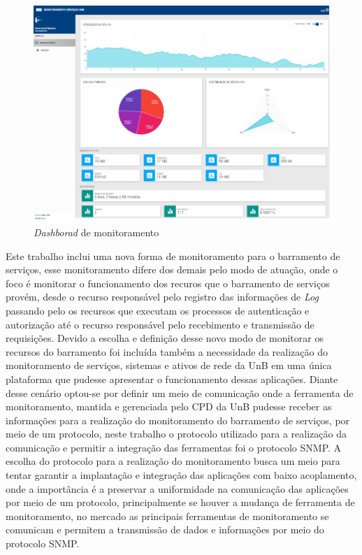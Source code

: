 \begin{figure}[h!]
	\begin{center}
	\includegraphics[scale = 0.70]{img/dashboard.jpg}
		\caption{\textit{Dashborad} de monitoramento \cite{filgueirasmonitoramento}}
		\label{fun:fig:dashboardS}
	\end{center}
\end{figure}

Este trabalho inclui uma nova forma de monitoramento para o barramento de serviços, esse monitoramento difere dos demais pelo modo de atuação, onde o foco é monitorar o funcionamento dos recuros que o barramento de serviços provém, desde o recurso responsável pelo registro das informações de \textit{Log} passando pelo os recursos que executam os processos de autenticação e autorização até o recurso responsável pelo recebimento e transmissão de requisições. Devido a escolha e definição desse novo modo de monitorar os recursos do barramento foi incluída também a necessidade da realização do monitoramento de serviços, sistemas e ativos de rede da \acrshort{UnB} em uma única plataforma que pudesse apresentar o funcionamento dessas aplicações. Diante desse cenário optou-se por definir um meio de comunicação onde a ferramenta de monitoramento, mantida e gerenciada pelo \acrshort{CPD} da \acrshort{UnB} pudesse receber as informações para a realização do monitoramento do barramento de serviços, por meio de um protocolo, neste trabalho o protocolo utilizado para a realização da comunicação e permitir a integração das ferramentas foi o protocolo \acrshort{SNMP}. A escolha do protocolo para a realização do monitoramento busca um meio para tentar garantir a implantação e integração das aplicações com baixo acoplamento, onde a importância é a preservar a uniformidade na comunicação das aplicações por meio de um protocolo, principalmente se houver a mudança de ferramenta de monitoramento, no mercado as principais ferramentas de monitoramento se comunicam e permitem a transmissão de dados e informações por meio do protocolo \acrshort{SNMP}.     

